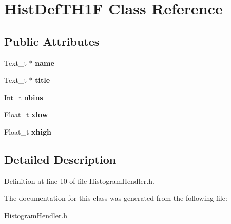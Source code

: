 \section{Hist\-Def\-T\-H1\-F Class Reference}
\label{classHistDefTH1F}
\subsection*{Public Attributes}
\begin{DoxyCompactItemize}
\item 
Text\-\_\-t $\ast$ {\bfseries name}\label{classHistDefTH1F_ab1da75ca62e61ac7e8b08228be812a3e}

\item 
Text\-\_\-t $\ast$ {\bfseries title}\label{classHistDefTH1F_a8ca14606574390a747ed6c82f5dca7b5}

\item 
Int\-\_\-t {\bfseries nbins}\label{classHistDefTH1F_aaabd29517306eb87322a1caf50641d37}

\item 
Float\-\_\-t {\bfseries xlow}\label{classHistDefTH1F_ad523a35ab41833d40c797f01f0ca5dbd}

\item 
Float\-\_\-t {\bfseries xhigh}\label{classHistDefTH1F_ac43cafd20064ba5bfd738c289ff563c8}

\end{DoxyCompactItemize}


\subsection{Detailed Description}


Definition at line 10 of file Histogram\-Hendler.\-h.



The documentation for this class was generated from the following file\-:\begin{DoxyCompactItemize}
\item 
Histogram\-Hendler.\-h\end{DoxyCompactItemize}
